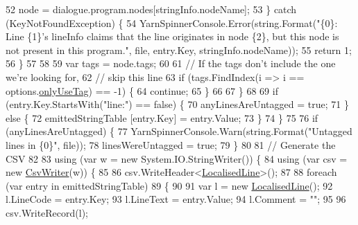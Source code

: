 \begin{DoxyCode}
52                             node = dialogue.program.nodes[stringInfo.nodeName];
53                         \} \textcolor{keywordflow}{catch} (KeyNotFoundException) \{
54                             YarnSpinnerConsole.Error(string.Format(\textcolor{stringliteral}{"\{0\}: Line \{1\}'s lineInfo claims that
       the line originates in node \{2\}, but this node is not present in this program."}, file, entry.Key, 
      stringInfo.nodeName));
55                             \textcolor{keywordflow}{return} 1;
56                         \}
57 
58 
59                         var tags = node.tags;
60 
61                         \textcolor{comment}{// If the tags don't include the one we're looking for,}
62                         \textcolor{comment}{// skip this line}
63                         \textcolor{keywordflow}{if} (tags.FindIndex(i => i == options.\hyperlink{a00085_a8b30c1b7fb1b74eae455a568c1024b3d}{onlyUseTag}) == -1) \{
64                             \textcolor{keywordflow}{continue};
65                         \}
66 
67                     \}
68 
69                     \textcolor{keywordflow}{if} (entry.Key.StartsWith(\textcolor{stringliteral}{"line:"}) == \textcolor{keyword}{false}) \{
70                         anyLinesAreUntagged = \textcolor{keyword}{true};
71                     \} \textcolor{keywordflow}{else} \{
72                         emittedStringTable [entry.Key] = entry.Value;
73                     \}
74                 \}
75 
76                 \textcolor{keywordflow}{if} (anyLinesAreUntagged) \{
77                     YarnSpinnerConsole.Warn(string.Format(\textcolor{stringliteral}{"Untagged lines in \{0\}"}, file));
78                     linesWereUntagged = \textcolor{keyword}{true};
79                 \}
80 
81                 \textcolor{comment}{// Generate the CSV}
82 
83                 \textcolor{keyword}{using} (var w = \textcolor{keyword}{new} System.IO.StringWriter()) \{
84                     \textcolor{keyword}{using} (var csv = \textcolor{keyword}{new} \hyperlink{a00061}{CsvWriter}(w)) \{
85 
86                         csv.WriteHeader<\hyperlink{a00108}{LocalisedLine}>();
87 
88                         \textcolor{keywordflow}{foreach} (var entry \textcolor{keywordflow}{in} emittedStringTable)
89                         \{
90 
91                             var l = \textcolor{keyword}{new} \hyperlink{a00108}{LocalisedLine}();
92                             l.LineCode = entry.Key;
93                             l.LineText = entry.Value;
94                             l.Comment = \textcolor{stringliteral}{""};
95 
96                             csv.WriteRecord(l);

\end{DoxyCode}
